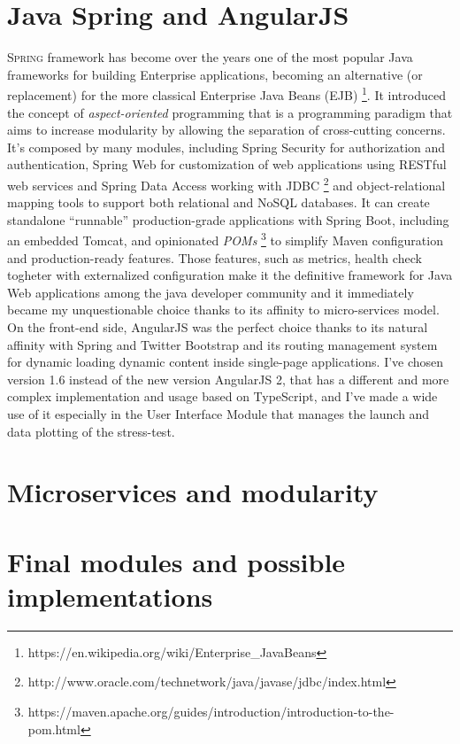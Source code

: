 \section{Java Spring and AngularJS}
\label{sec:3}
\textsc{Spring} framework has become over the years one of the most popular Java frameworks for building  Enterprise applications, becoming an alternative (or replacement) for the more classical Enterprise Java Beans (EJB)  \footnote{https://en.wikipedia.org/wiki/Enterprise\_JavaBeans}. It introduced the concept of \textit{aspect-oriented} programming that is a programming paradigm that aims to increase modularity by allowing the separation of cross-cutting concerns. It’s composed by many modules, including Spring Security for authorization and authentication, Spring Web for customization of web applications using RESTful web services and Spring Data Access working with \textsc{JDBC} \footnote{http://www.oracle.com/technetwork/java/javase/jdbc/index.html} and object-relational mapping tools to support both relational and NoSQL databases. 
It can create standalone “runnable” production-grade applications with Spring Boot, including an embedded Tomcat, and opinionated \textit{POMs} \footnote{https://maven.apache.org/guides/introduction/introduction-to-the-pom.html} to simplify Maven configuration and production-ready features.
Those features, such as metrics, health check togheter with externalized configuration make it the definitive framework for Java Web applications among the java developer community and  it immediately became my unquestionable choice thanks to its affinity to micro-services model.
On the front-end side, AngularJS was the perfect choice thanks to its natural affinity with Spring and Twitter Bootstrap and its routing management system for dynamic loading dynamic content inside single-page applications. I’ve chosen version 1.6 instead of the new version AngularJS 2, that has a different and more complex implementation and usage based on TypeScript, and I’ve made a wide use of it especially in the User Interface Module that manages the launch and data plotting  of the stress-test.

\section{Microservices and modularity}
\label{sec:4}

\section{Final modules and possible implementations}
\label{sec:5}

